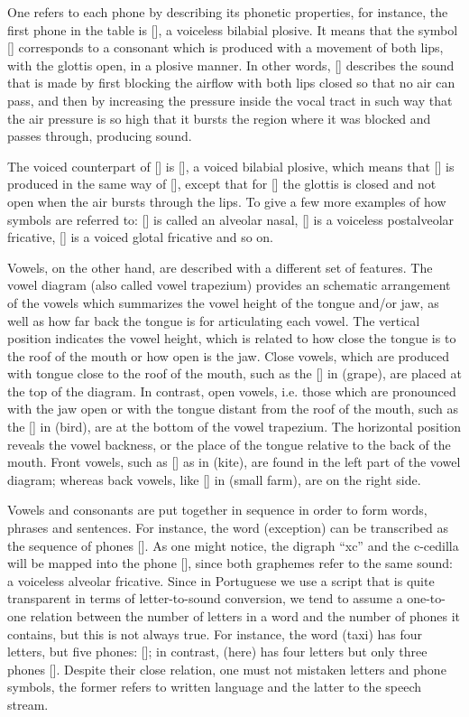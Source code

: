 One refers to each phone by describing its phonetic properties, for instance, the first phone in the table is [], a voiceless bilabial plosive. It means that the symbol [] corresponds to a consonant which is produced with a movement of both lips, with the glottis open, in a plosive manner. In other words, [] describes the sound that is made by first blocking the airflow with both lips closed so that no air can pass, and then by increasing the pressure inside the vocal tract in such way that the air pressure is so high that it bursts the region where it was blocked and passes through, producing sound.

The voiced counterpart of [] is [], a voiced bilabial plosive, which means that [] is produced in the same way of [], except that for [] the glottis is closed and not open when the air bursts through the lips. To give a few more examples of how symbols are referred to: [] is called an alveolar nasal, [] is a voiceless postalveolar fricative, [] is a voiced glotal fricative and so on.

Vowels, on the other hand, are described with a different set of features. The vowel diagram (also called vowel trapezium) provides an schematic arrangement of the vowels which summarizes the vowel height of the tongue and/or jaw, as well as how far back the tongue is for articulating each vowel. The vertical position indicates the vowel height, which is related to how close the tongue is to the roof of the mouth or how open is the jaw. Close vowels, which are produced with tongue close to the roof of the mouth, such as the [] in  (grape), are placed at the top of the diagram. In contrast, open vowels, i.e. those which are pronounced with the jaw open or with the tongue distant from the roof of the mouth, such as the [] in  (bird), are at the bottom of the vowel trapezium. The horizontal position reveals the vowel backness, or the place of the tongue relative to the back of the mouth. Front vowels, such as [] as in  (kite), are found in the left part of the vowel diagram; whereas back vowels, like [] in  (small farm), are on the right side.

Vowels and consonants are put together in sequence in order to form words, phrases and sentences. For instance, the word  (exception) can be transcribed as the sequence of phones []. As one might notice, the digraph ``xc'' and the c-cedilla will be mapped into the phone [], since both graphemes refer to the same sound: a voiceless alveolar fricative. Since in Portuguese we use a script that is quite transparent in terms of letter-to-sound conversion, we tend to assume a one-to-one relation between the number of letters in a word and the number of phones it contains, but this is not always true. For instance, the word  (taxi) has four letters, but five phones: []; in contrast,  (here) has four letters but only three phones []. Despite their close relation, one must not mistaken letters and phone symbols, the former refers to written language and the latter to the speech stream.

